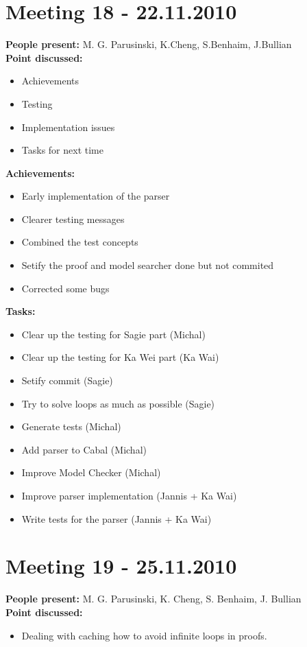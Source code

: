 \documentclass[12pt,a4paper]{article}
\begin{document}
\section*{Meeting 18 - 22.11.2010}
\textbf{People present:} M. G. Parusinski, K.Cheng, S.Benhaim, J.Bullian \\
\textbf{Point discussed:}
\begin{itemize}
\item Achievements
\item Testing
\item Implementation issues
\item Tasks for next time
\end{itemize}
\textbf{Achievements:}
\begin{itemize}
\item Early implementation of the parser
\item Clearer testing messages
\item Combined the test concepts
\item Setify the proof and model searcher done but not commited
\item Corrected some bugs
\end{itemize}
\textbf{Tasks:}
\begin{itemize}
\item Clear up the testing for Sagie part (Michal)
\item Clear up the testing for Ka Wei part (Ka Wai)
\item Setify commit (Sagie)
\item Try to solve loops as much as possible (Sagie)
\item Generate tests (Michal)
\item Add parser to Cabal (Michal)
\item Improve Model Checker (Michal)
\item Improve parser implementation (Jannis + Ka Wai)
\item Write tests for the parser (Jannis + Ka Wai)
\end{itemize}

\section*{Meeting 19 - 25.11.2010}
\textbf{People present:} M. G. Parusinski, K. Cheng, S. Benhaim, J. Bullian \\
\textbf{Point discussed:}
\begin{itemize}
\item Dealing with caching how to avoid infinite loops in proofs.
\end{itemize}
\end{document}
